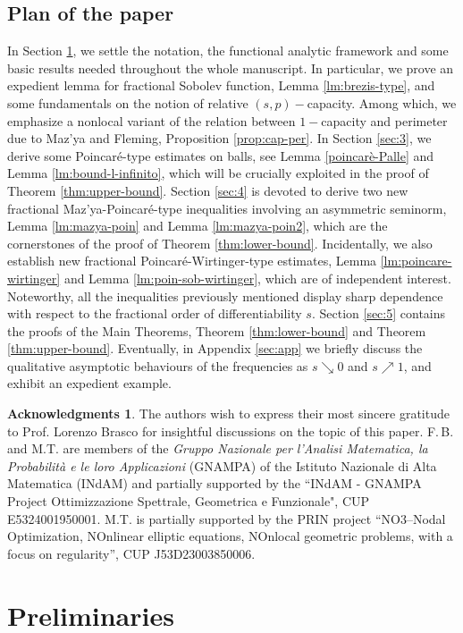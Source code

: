\documentclass{amsart}
\theoremstyle{definition}
\newtheorem*{ack}{Acknowledgments}
\numberwithin{equation}{section}
\begin{document}
	\subsection{Plan of the paper} In Section \ref{sec:2}, we settle the notation, the functional analytic framework and some basic results needed throughout the whole manuscript. In particular, we prove an expedient lemma for fractional Sobolev function, Lemma \ref{lm:brezis-type}, and some fundamentals on the notion of relative $(s,p)-$capacity. Among which, we emphasize a nonlocal variant of the relation between $1-$capacity and perimeter due to Maz'ya and Fleming, Proposition \ref{prop:cap-per}. In Section \ref{sec:3}, we derive some Poincar\'e-type estimates on balls, see Lemma \ref{poincarè-Palle} and Lemma \ref{lm:bound-l-infinito}, which will be crucially exploited in the proof of Theorem \ref{thm:upper-bound}. Section \ref{sec:4} is devoted to derive two new fractional Maz'ya-Poincar\'e-type inequalities involving an asymmetric seminorm, Lemma \ref{lm:mazya-poin} and Lemma \ref{lm:mazya-poin2}, which are the cornerstones of the proof of Theorem \ref{thm:lower-bound}. Incidentally, we also establish new fractional Poincar\'e-Wirtinger-type estimates, Lemma \ref{lm:poincare-wirtinger} and Lemma \ref{lm:poin-sob-wirtinger}, which are of independent interest. Noteworthy, all the inequalities previously mentioned display sharp dependence with respect to the fractional order of differentiability $s$. Section \ref{sec:5} contains the proofs of the Main Theorems, Theorem \ref{thm:lower-bound} and Theorem \ref{thm:upper-bound}. Eventually, in Appendix \ref{sec:app} we briefly discuss the qualitative asymptotic behaviours of the frequencies as $s \searrow 0$ and $s \nearrow 1$, and exhibit an expedient example.   
	
	\begin{ack}
		The authors wish to express their most sincere gratitude to Prof. Lorenzo Brasco for insightful discussions on the topic of this paper. F.\,B. and M.T. are members of the {\it Gruppo Nazionale per l'Analisi Matematica, la Probabilit\`a
			e le loro Applicazioni} (GNAMPA) of the Istituto Nazionale di Alta Matematica (INdAM) and partially supported by the ``INdAM - GNAMPA Project Ottimizzazione Spettrale, Geometrica e Funzionale", CUP E5324001950001. M.T. is partially supported by the PRIN project ``NO3–Nodal Optimization, NOnlinear elliptic equations, NOnlocal geometric problems, with a focus on regularity”, CUP J53D23003850006.
	\end{ack}
	\section{Preliminaries}
	\label{sec:2}
\end{document}
